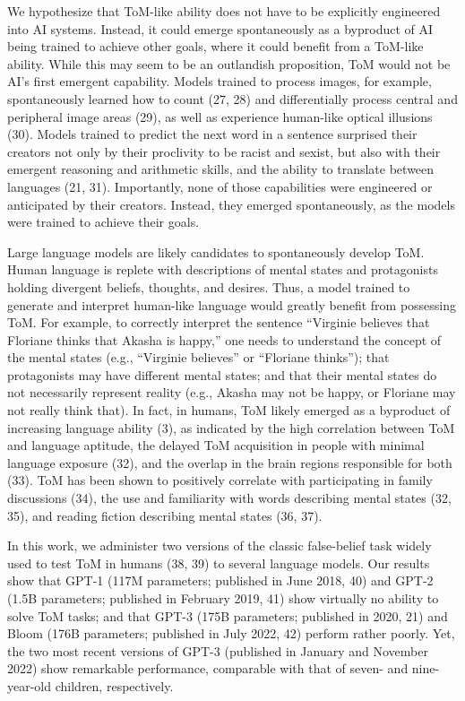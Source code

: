 \documentclass[11pt]{article}
\begin{document}
We hypothesize that ToM-like ability does not have to be explicitly engineered into AI systems. Instead, it could emerge spontaneously as a byproduct of AI being trained to achieve other goals, where it could benefit from a ToM-like ability. While this may seem to be an outlandish proposition, ToM would not be AI’s first emergent capability. Models trained to process images, for example, spontaneously learned how to count (27, 28) and differentially process central and peripheral image areas (29), as well as experience human-like optical illusions (30). Models trained to predict the next word in a sentence surprised their creators not only by their proclivity to be racist and sexist, but also with their emergent reasoning and arithmetic skills, and the ability to translate between languages (21, 31). Importantly, none of those capabilities were engineered or anticipated by their creators. Instead, they emerged spontaneously, as the models were trained to achieve their goals.

Large language models are likely candidates to spontaneously develop ToM. Human language is replete with descriptions of mental states and protagonists holding divergent beliefs, thoughts, and desires. Thus, a model trained to generate and interpret human-like language would greatly benefit from possessing ToM. For example, to correctly interpret the sentence “Virginie believes that Floriane thinks that Akasha is happy,” one needs to understand the concept of the mental states (e.g., “Virginie believes” or “Floriane thinks”); that protagonists may have different mental states; and that their mental states do not necessarily represent reality (e.g., Akasha may not be happy, or Floriane may not really think that). In fact, in humans, ToM likely emerged as a byproduct of increasing language ability (3), as indicated by the high correlation between ToM and language aptitude, the delayed ToM acquisition in people with minimal language exposure (32), and the overlap in the brain regions responsible for both (33). ToM has been shown to positively correlate with participating in family discussions (34), the use and familiarity with words describing mental states (32, 35), and reading fiction describing mental states (36, 37).

In this work, we administer two versions of the classic false-belief task widely used to test ToM in humans (38, 39) to several language models. Our results show that GPT-1 (117M parameters; published in June 2018, 40) and GPT-2 (1.5B parameters; published in February 2019, 41) show virtually no ability to solve ToM tasks; and that GPT-3 (175B parameters; published in 2020, 21) and Bloom (176B parameters; published in July 2022, 42) perform rather poorly. Yet, the two most recent versions of GPT-3 (published in January and November 2022) show remarkable performance, comparable with that of seven- and nine-year-old children, respectively.
\end{document}
